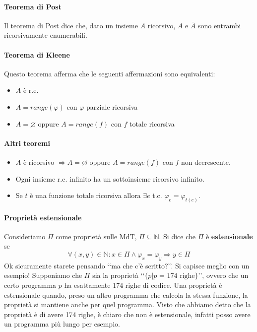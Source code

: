 \documentclass[a4paper,oneside]{scrbook}
\begin{document}
\paragraph{Teorema di Post}
Il teorema di Post dice che, dato un insieme $A$ ricorsivo, $A$ e $\bar{A}$ sono entrambi ricorsivamente enumerabili.

\paragraph{Teorema di Kleene}
Questo teorema afferma che le seguenti affermazioni sono equivalenti:
\begin{itemize}
	\item $A$ è r.e.
	\item $A=range(\varphi)$ con $\varphi$ parziale ricorsiva
	\item $A=\varnothing$ oppure $A=range(f)$ con $f$ totale ricorsiva
\end{itemize}

\paragraph{Altri teoremi}
\begin{itemize}
	\item $A$ è ricorsivo $\Rightarrow A=\varnothing$ oppure $A=range(f)$ con $f$ non decrescente.
	\item Ogni insieme r.e. infinito ha un sottoinsieme ricorsivo infinito.
	\item Se $t$ è una funzione totale ricorsiva allora $\exists e$ t.c. $\varphi_e=\varphi_{t(e)}$.
\end{itemize}

\paragraph{Proprietà estensionale}
Consideriamo $\Pi$ come proprietà sulle MdT, $\Pi \subseteq \mathbb{N}$. Si dice che $\Pi$ è \textbf{estensionale} se
\begin{equation*}
	\forall(x,y)\in\mathbb{N}: x\in\Pi \wedge \varphi_x=\varphi_y \Rightarrow y\in\Pi
\end{equation*}
Ok sicuramente starete pensando ‘‘ma che c'è scritto?’’. Si capisce meglio con un esempio!
Supponiamo che $\Pi$ sia la proprietà ‘‘$\{p|p\text{ = 174 righe}\}$’’, ovvero che un certo programma $p$ ha esattamente 174 righe di codice.
Una proprietà è estensionale quando, preso un altro programma che calcola la stessa funzione, la proprietà si mantiene anche per quel programma.
Visto che abbiamo detto che la proprietà è di avere 174 righe, è chiaro che non è estensionale, infatti posso avere un programma più lungo per esempio.
\end{document}

